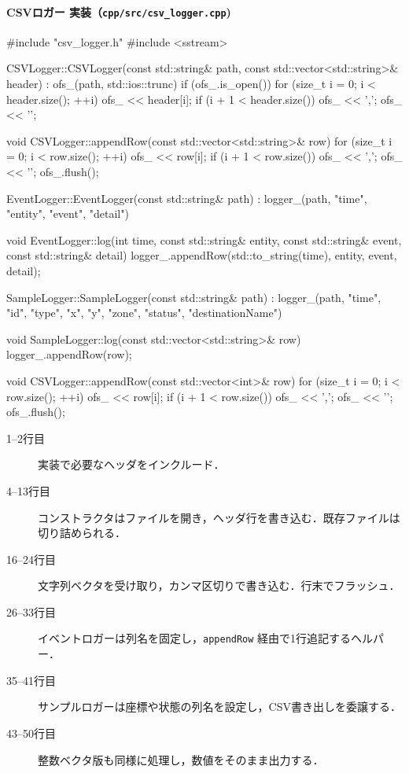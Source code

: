\documentclass[10pt,letterpaper]{jsarticle}
\begin{document}
\paragraph{CSVロガー 実装（\texttt{cpp/src/csv\_logger.cpp})}
\begin{cppcode}
#include "csv_logger.h"
#include <sstream>

CSVLogger::CSVLogger(const std::string& path, const std::vector<std::string>& header)
    : ofs_(path, std::ios::trunc)
{
    if (ofs_.is_open()) {
        for (size_t i = 0; i < header.size(); ++i) {
            ofs_ << header[i];
            if (i + 1 < header.size()) ofs_ << ',';
        }
        ofs_ << '\n';
    }
}

void CSVLogger::appendRow(const std::vector<std::string>& row)
{
    for (size_t i = 0; i < row.size(); ++i) {
        ofs_ << row[i];
        if (i + 1 < row.size()) ofs_ << ',';
    }
    ofs_ << '\n';
    ofs_.flush();
}

EventLogger::EventLogger(const std::string& path)
    : logger_(path, {"time", "entity", "event", "detail"})
{
}

void EventLogger::log(int time, const std::string& entity,
                      const std::string& event, const std::string& detail)
{
    logger_.appendRow({std::to_string(time), entity, event, detail});
}

SampleLogger::SampleLogger(const std::string& path)
    : logger_(path, {"time", "id", "type", "x", "y", "zone", "status", "destinationName"})
{
}

void SampleLogger::log(const std::vector<std::string>& row)
{
    logger_.appendRow(row);
}

void CSVLogger::appendRow(const std::vector<int>& row)
{
    for (size_t i = 0; i < row.size(); ++i) {
        ofs_ << row[i];
        if (i + 1 < row.size()) ofs_ << ',';
    }
    ofs_ << '\n';
    ofs_.flush();
}
\end{cppcode}
\begin{description}
  \item[1--2行目] 実装で必要なヘッダをインクルード．
  \item[4--13行目] コンストラクタはファイルを開き，ヘッダ行を書き込む．既存ファイルは切り詰められる．
  \item[16--24行目] 文字列ベクタを受け取り，カンマ区切りで書き込む．行末でフラッシュ．
  \item[26--33行目] イベントロガーは列名を固定し，\texttt{appendRow} 経由で1行追記するヘルパー．
  \item[35--41行目] サンプルロガーは座標や状態の列名を設定し，CSV書き出しを委譲する．
  \item[43--50行目] 整数ベクタ版も同様に処理し，数値をそのまま出力する．
\end{description}
\end{document}
